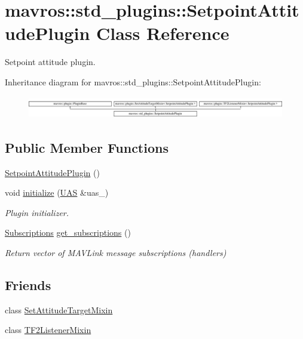 \hypertarget{classmavros_1_1std__plugins_1_1SetpointAttitudePlugin}{}\section{mavros\+::std\+\_\+plugins\+::Setpoint\+Attitude\+Plugin Class Reference}
\label{classmavros_1_1std__plugins_1_1SetpointAttitudePlugin}


Setpoint attitude plugin.  


Inheritance diagram for mavros\+::std\+\_\+plugins\+::Setpoint\+Attitude\+Plugin\+:\begin{figure}[H]
\begin{center}
\leavevmode
\includegraphics[height=0.985048cm]{classmavros_1_1std__plugins_1_1SetpointAttitudePlugin}
\end{center}
\end{figure}
\subsection*{Public Member Functions}
\begin{DoxyCompactItemize}
\item 
\mbox{\hyperlink{group__plugin_ga59562b4cfc4d05afd3772b3e4d050098}{Setpoint\+Attitude\+Plugin}} ()
\item 
void \mbox{\hyperlink{group__plugin_ga99901f90ec1683567962b8d131efe84e}{initialize}} (\mbox{\hyperlink{classmavros_1_1UAS}{U\+AS}} \&uas\+\_\+)
\begin{DoxyCompactList}\small\item\em Plugin initializer. \end{DoxyCompactList}\item 
\mbox{\hyperlink{group__plugin_ga8967d61fc77040e0c3ea5a4585d62a09}{Subscriptions}} \mbox{\hyperlink{group__plugin_ga41b8d12774fb380cb28817f5adec25e5}{get\+\_\+subscriptions}} ()
\begin{DoxyCompactList}\small\item\em Return vector of M\+A\+V\+Link message subscriptions (handlers) \end{DoxyCompactList}\end{DoxyCompactItemize}
\subsection*{Friends}
\begin{DoxyCompactItemize}
\item 
class \mbox{\hyperlink{group__plugin_ga1d68f99fc6ccc3d89d32bd54885749f7}{Set\+Attitude\+Target\+Mixin}}
\item 
class \mbox{\hyperlink{group__plugin_ga0eb3bbd8737231d2db969230d1d8b54b}{T\+F2\+Listener\+Mixin}}
\end{DoxyCompactItemize}
